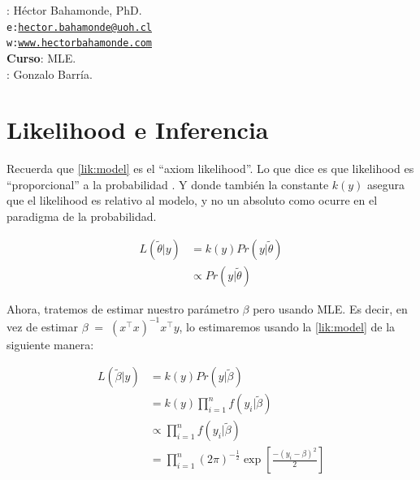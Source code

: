 \documentclass[onesided]{article}\usepackage[]{graphicx}\usepackage[]{color}
\begin{document}











\hspace{-5mm}{\bf Profesor}: H\'ector Bahamonde, PhD.\\
\texttt{e:}\href{mailto:hector.bahamonde@uoh.cl}{\texttt{hector.bahamonde@uoh.cl}}\\
\texttt{w:}\href{http://www.hectorbahamonde.com}{\texttt{www.hectorbahamonde.com}}\\
{\bf Curso}: MLE.\\
\hspace{-5mm}{\bf TA}: Gonzalo Barr\'ia.


\section{Likelihood e Inferencia}

Recuerda que \autoref{lik:model} es el ``axiom likelihood''. Lo que dice es que likelihood es ``proporcional'' a la probabilidad \parencite[59]{King1998}. Y donde tambi\'en la constante $k(y)$ asegura que el likelihood es relativo al modelo, y no un absoluto como ocurre en el paradigma de la probabilidad.


\begin{equation} \label{lik:model}
\begin{split}
L(\tilde{\theta}|y) & =  k(y)Pr(y|\tilde{\theta})\\
& \propto Pr(y|\tilde{\theta})
\end{split}
\end{equation}


Ahora, tratemos de estimar nuestro par\'ametro $\beta$ pero usando MLE. Es decir, en vez de estimar $\beta \;=\; (x^{\top}x)^{-1}x^{\top}y$, lo estimaremos usando la \autoref{lik:model} de la siguiente manera:


\begin{equation} \label{lik:beta}
\begin{split}
L(\tilde{\beta}|y) & = k(y)Pr(y|\tilde{\beta})\\
                   & = k(y) \prod_{i=1}^{n} f(y_{i}|\tilde{\beta})\\
                   & \propto \prod_{i=1}^{n} f(y_{i}|\tilde{\beta})\\
                   & = \prod_{i=1}^{n} (2\pi)^{-\frac{1}{2}} \exp\left[ \frac{-(y_{i}-\beta)^{2}}{2} \right]
\end{split}
\end{equation}
\end{document}
